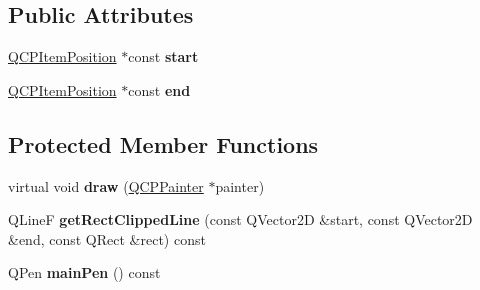 \subsection*{Public Attributes}
\begin{DoxyCompactItemize}
\item 
\hyperlink{classQCPItemPosition}{Q\+C\+P\+Item\+Position} $\ast$const {\bfseries start}\hypertarget{classQCPItemLine_a602da607a09498b0f152ada1d6851bc5}{}\label{classQCPItemLine_a602da607a09498b0f152ada1d6851bc5}

\item 
\hyperlink{classQCPItemPosition}{Q\+C\+P\+Item\+Position} $\ast$const {\bfseries end}\hypertarget{classQCPItemLine_a15598864c1c22a2497a1979c4980c4e1}{}\label{classQCPItemLine_a15598864c1c22a2497a1979c4980c4e1}

\end{DoxyCompactItemize}
\subsection*{Protected Member Functions}
\begin{DoxyCompactItemize}
\item 
virtual void {\bfseries draw} (\hyperlink{classQCPPainter}{Q\+C\+P\+Painter} $\ast$painter)\hypertarget{classQCPItemLine_a1fc045dd33919f8006df0692aeb0e84a}{}\label{classQCPItemLine_a1fc045dd33919f8006df0692aeb0e84a}

\item 
Q\+LineF {\bfseries get\+Rect\+Clipped\+Line} (const Q\+Vector2D \&start, const Q\+Vector2D \&end, const Q\+Rect \&rect) const \hypertarget{classQCPItemLine_a36e8620019a221ccea4357f0287b81c2}{}\label{classQCPItemLine_a36e8620019a221ccea4357f0287b81c2}

\item 
Q\+Pen {\bfseries main\+Pen} () const \hypertarget{classQCPItemLine_a7b5bc4ebacb55774b87c91b308ca7912}{}\label{classQCPItemLine_a7b5bc4ebacb55774b87c91b308ca7912}

\end{DoxyCompactItemize}
